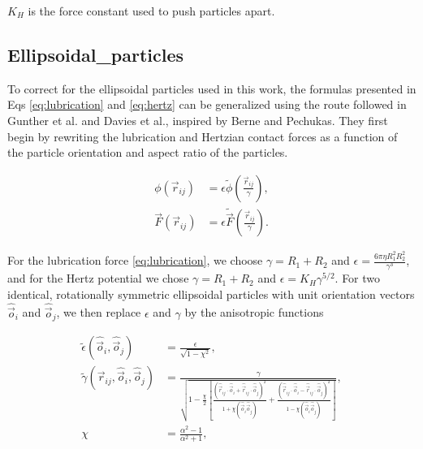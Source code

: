 $K_H$ is the force constant used to push particles apart. 

\subsection{Ellipsoidal_particles}
\label{section:ellipsoidal_particles}

To correct for the ellipsoidal particles used in this work, 
the formulas presented in Eqs \ref{eq:lubrication} and \ref{eq:hertz} can be generalized using the route followed 
in Gunther et al. and Davies et al., inspired by Berne and Pechukas. \cite{gunther_timescales_2014, davies_interface_2014} 
They first begin by rewriting the lubrication and Hertzian contact forces as a function of the particle orientation and 
aspect ratio of the particles.

\begin{equation}
    \begin{split}
    \phi(\vec{r}_{ij}) &= {\epsilon} \tilde{\phi}\left(\frac{\vec{r}_{ij}}{{\gamma}}\right) , \\
    \vec{F}(\vec{r}_{ij}) &= {\epsilon} \tilde{\vec{F}}\left(\frac{\vec{r}_{ij}}{{\gamma}}\right) .
    \end{split}
\end{equation}

For the lubrication force \eqref{eq:lubrication}, we choose
${\gamma}=R_1+R_2$ and ${\epsilon}=\frac{6\pi\eta R_1^2 R_2^2}{{\gamma^3}}$, and for the
Hertz potential we chose ${\gamma}=R_1+R_2$ and ${\epsilon}=K_H\gamma^{5/2}$. For two identical, rotationally
symmetric ellipsoidal particles with unit orientation vectors $\hat{\vec{o}}_i$ and $\hat{\vec{o}}_j$, we then replace $\epsilon$ and $\gamma$ by
the anisotropic functions

\begin{equation}
    \begin{split}
    \tilde\epsilon\left(\hat{\vec{o}}_i, \hat{\vec{o}}_j\right) &= \frac{{\epsilon}}{\sqrt{1-\chi^2}} , \\
    \tilde\gamma\left(\vec{r}_{ij}, \hat{\vec{o}}_i, \hat{\vec{o}}_j\right) &= \frac{{\gamma}}{\sqrt{1-\frac{\chi}{2}\left[ \frac{\left(\hat{\vec{r}}_{ij}\cdot\hat{\vec{o}}_i+\hat{\vec{r}}_{ij}\cdot\hat{\vec{o}}_j\right)^2}{1+\chi\left(\hat{\vec{o}}_i\hat{\vec{o}}_j\right)} + \frac{\left(\hat{\vec{r}}_{ij}\cdot\hat{\vec{o}}_i-\hat{\vec{r}}_{ij}\cdot\hat{\vec{o}}_j\right)^2}{1-\chi\left(\hat{\vec{o}}_i\hat{\vec{o}}_j\right)} \right] }} , \\
    \chi &= \frac{\alpha^2-1}{\alpha^2+1} , \\
    \end{split}
\end{equation}

